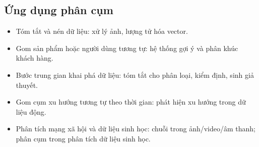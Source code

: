\subsection{Ứng dụng phân cụm}

\begin{ungdung}[title={Ứng dụng phân cụm}]
  \begin{itemize}
    \item Tóm tắt và nén dữ liệu: xử lý ảnh, lượng tử hóa vector.
    \item Gom sản phẩm hoặc người dùng tương tự: hệ thống gợi ý và phân khúc khách hàng.
    \item Bước trung gian khai phá dữ liệu: tóm tắt cho phân loại, kiểm định, sinh giả thuyết.
    \item Gom cụm xu hướng tương tự theo thời gian: phát hiện xu hướng trong dữ liệu động.
    \item Phân tích mạng xã hội và dữ liệu sinh học: chuỗi trong ảnh/video/âm thanh; phân cụm trong phân tích dữ liệu sinh học.
  \end{itemize}
\end{ungdung}
